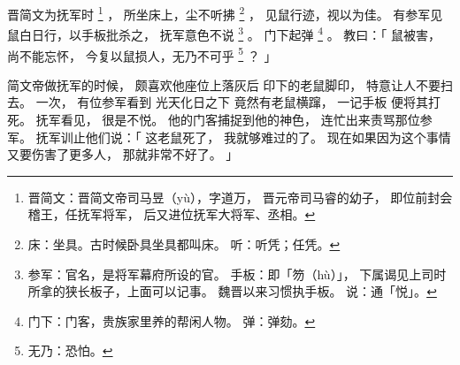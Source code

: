 
\switchcolumn*[\section{}]

晋简文为抚军时%
\footnote{%
    晋简文：晋简文帝司马昱（yù），字道万，
            晋元帝司马睿的幼子，
            即位前封会稽王，任抚军将军，
            后又进位抚军大将军、丞相。
}%
，
所坐床上，尘不听拂%
\footnote{%
    床：坐具。古时候卧具坐具都叫床。
    听：听凭；任凭。
}%
，
见鼠行迹，视以为佳。
有参军见鼠白日行，以手板批杀之，
抚军意色不说%
\footnote{%
    参军：官名，是将军幕府所设的官。
    手板：即「笏（hù）」，
          下属谒见上司时所拿的狭长板子，上面可以记事。
          魏晋以来习惯执手板。
    说：通「悦」。
}%
。
门下起弹%
\footnote{%
    门下：门客，贵族家里养的帮闲人物。
    弹：弹劾。
}%
。
教曰：「
    鼠被害，
    尚不能忘怀，
    今复以鼠损人，无乃不可乎%
    \footnote{%
        无乃：恐怕。
    }%
    ？
」

\switchcolumn

简文帝做抚军的时候，
颇喜欢他座位上落灰后
印下的老鼠脚印，
特意让人不要扫去。
一次，
有位参军看到
光天化日之下
竟然有老鼠横蹿，
一记手板
便将其打死。
抚军看见，
很是不悦。
他的门客捕捉到他的神色，
连忙出来责骂那位参军。
抚军训止他们说：「
    这老鼠死了，
    我就够难过的了。
    现在如果因为这个事情
    又要伤害了更多人，
    那就非常不好了。
」

